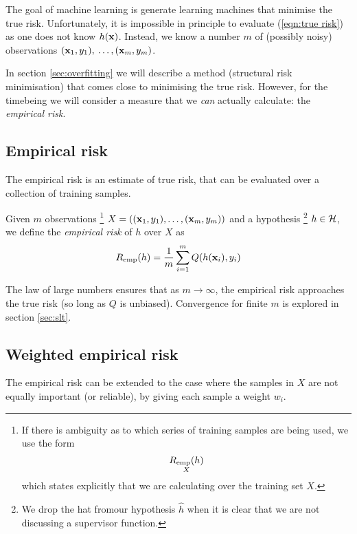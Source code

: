 The goal of machine learning is generate learning machines that
minimise the true risk.  Unfortunately, it is impossible in
principle to evaluate (\ref{eqn:true risk}) as one does not know
$h(\mathbf{x})$.   Instead, we know a number $m$ of (possibly noisy)
observations $(\mathbf{x}_1, y_1),\: \ldots, (\mathbf{x}_m, y_m)$.

In section \ref{sec:overfitting} we will describe a method (structural
risk minimisation) that comes close to minimising the true risk.
However, for the timebeing we will consider a measure that we
\emph{can} actually calculate: the \emph{empirical risk}.


\subsection{Empirical risk}
\label{sec:empirical risk}
The empirical risk is an estimate of true risk, that can be evaluated
over a collection of training samples.

\begin{definition}
Given $m$ observations%
\footnote{If there is ambiguity as to which series of training samples
are being used, we use the form
%
\begin{equation*}
\underset{X}{R_{\mathrm{emp}}(h)}
\end{equation*}
%
which states explicitly that we are calculating over the training set
$X$.}
$X = ((\mathbf{x}_1, y_1), \ldots, (\mathbf{x}_m, y_m))$ and a hypothesis%
\footnote{We drop the hat fromour hypothesis $\hat{h}$ when it is
clear that we are not discussing a supervisor function.}
$h \in \mathcal{H}$, we define the \emph{empirical risk} of $h$ over $X$ as
%
\begin{equation}
R_{\mathrm{emp}}(h) = \frac{1}{m} \sum_{i=1}^{m} Q(h(\mathbf{x}_i), y_i)
\end{equation}
\end{definition}

The law of large numbers ensures that as $m \rightarrow \infty$, the
empirical risk approaches the true risk (so long as $Q$ is unbiased).
Convergence for finite $m$ is explored in section \ref{sec:slt}.

\subsection{Weighted empirical risk}
\label{sec:weighted empirical risk}

The empirical risk can be extended to the case where the samples in
$X$ are not equally important (or reliable), by giving each sample a
weight $w_i$.

